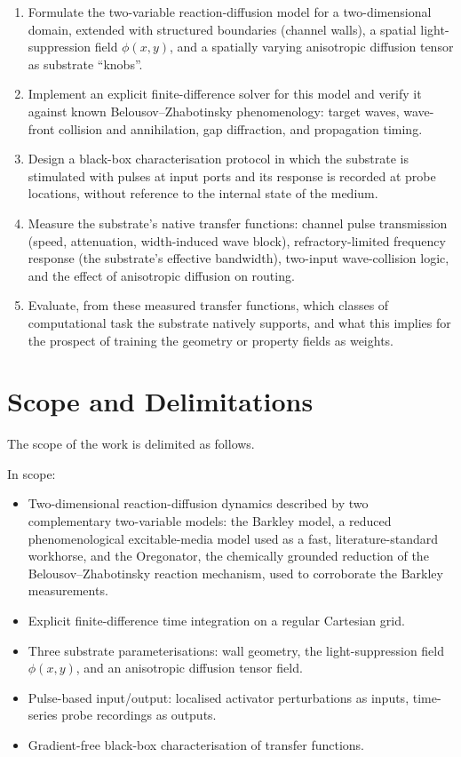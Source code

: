 \begin{enumerate}
    \item Formulate the two-variable reaction-diffusion model for a two-dimensional domain, extended with structured boundaries (channel walls), a spatial light-suppression field $\phi(x,y)$, and a spatially varying anisotropic diffusion tensor as substrate ``knobs''.
    \item Implement an explicit finite-difference solver for this model and verify it against known Belousov--Zhabotinsky phenomenology: target waves, wave-front collision and annihilation, gap diffraction, and propagation timing.
    \item Design a black-box characterisation protocol in which the substrate is stimulated with pulses at input ports and its response is recorded at probe locations, without reference to the internal state of the medium.
    \item Measure the substrate's native transfer functions: channel pulse transmission (speed, attenuation, width-induced wave block), refractory-limited frequency response (the substrate's effective bandwidth), two-input wave-collision logic, and the effect of anisotropic diffusion on routing.
    \item Evaluate, from these measured transfer functions, which classes of computational task the substrate natively supports, and what this implies for the prospect of training the geometry or property fields as weights.
\end{enumerate}

\section{Scope and Delimitations}
\label{sec:scope}

The scope of the work is delimited as follows.

In scope:
\begin{itemize}
    \item Two-dimensional reaction-diffusion dynamics described by two complementary two-variable models: the Barkley model, a reduced phenomenological excitable-media model used as a fast, literature-standard workhorse, and the Oregonator, the chemically grounded reduction of the Belousov--Zhabotinsky reaction mechanism, used to corroborate the Barkley measurements.
    \item Explicit finite-difference time integration on a regular Cartesian grid.
    \item Three substrate parameterisations: wall geometry, the light-suppression field $\phi(x,y)$, and an anisotropic diffusion tensor field.
    \item Pulse-based input/output: localised activator perturbations as inputs, time-series probe recordings as outputs.
    \item Gradient-free black-box characterisation of transfer functions.
\end{itemize}

